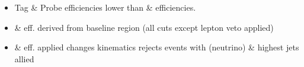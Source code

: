 \documentclass{beamer}
\begin{document}
\begin{frame}
\begin{columns}
\begin{column}{0.50\textwidth}
   \end{column}
  \end{columns}
\begin{itemize}
 \item Tag \& Probe efficiencies lower than \ttbar \& \wpj efficiencies.
 \item \ttbar \& \wpj eff. derived from baseline region (all cuts except lepton veto applied)
 \item \ttbar \& \wpj eff. \mindeltaphi applied changes kinematics rejects events with \MHT (neutrino) \& highest \pt jets allied
\end{itemize}

\end{frame}
\end{document}
